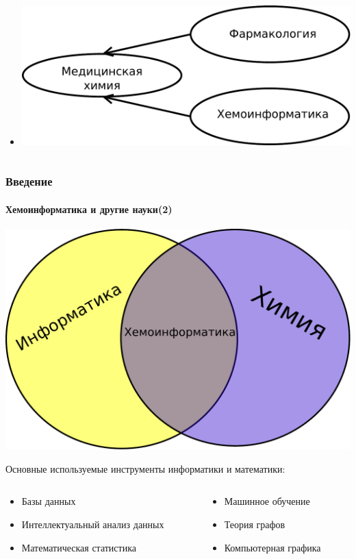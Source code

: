 \begin{frame}
\begin{columns}
\begin{column}{0.5\textwidth}
\begin{itemize}
      \item \includegraphics[scale=0.29]{images/Diagram4.pdf}
      \end{itemize}
    \end{column}
  \end{columns}
\end{frame}

\begin{frame}
  \frametitle{Введение}
  \framesubtitle{Хемоинформатика и другие науки(2)}

  \begin{center}
    \includegraphics[scale=0.3]{images/Diagram5.pdf}
  \end{center}

  Основные используемые инструменты информатики и математики:
  \begin{columns}
    \begin{column}{0.5\textwidth}
  \begin{itemize}
    \item Базы данных
    \item Интеллектуальный анализ данных
    \item Математическая статистика
   \end{itemize}
\end{column}
\begin{column}{0.5\textwidth}
  \begin{itemize}
   \item Машинное обучение
    \item Теория графов
    \item Компьютерная графика
      \end{itemize}

\end{column}
\end{columns}
\end{frame}

